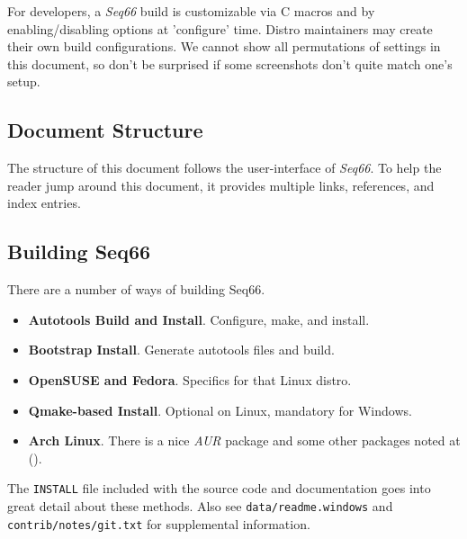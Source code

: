 \documentclass[
 11pt,
 twoside,
 a4paper,
 final                                 %
]{article}
\begin{document}
   For developers, a \textsl{Seq66} build is customizable via C macros and by
   enabling/disabling options at 'configure' time.
   Distro maintainers may create their own build configurations.
   We cannot show all permutations of settings in this document,
   so don't be surprised if some screenshots don't quite match one's setup.

\subsection{Document Structure}
\label{subsec:introduction_document_structure}

   The structure of this document follows the user-interface of
   \textsl{Seq66}.
   To help the reader jump around this document, it provides
   multiple links, references, and index entries.

\subsection{Building Seq66}
\label{subsec:introduction_building_seq66}

   There are a number of ways of building Seq66.

   \begin{itemize}
      \item \textbf{Autotools Build and Install}.
         Configure, make, and install.
      \item \textbf{Bootstrap Install}.
         Generate autotools files and build.
      \item \textbf{OpenSUSE and Fedora}.
         Specifics for that Linux distro.
      \item \textbf{Qmake-based Install}.
         Optional on Linux, mandatory for Windows.
      \item \textbf{Arch Linux}.
         There is a nice \textsl{AUR} package and some
         other packages noted at (\cite{repositories}).
   \end{itemize}

   The \texttt{INSTALL} file included with the source code and
   documentation goes into great detail about these methods.
   Also see \texttt{data/readme.windows} and \texttt{contrib/notes/git.txt}
   for supplemental information.






\end{document}
